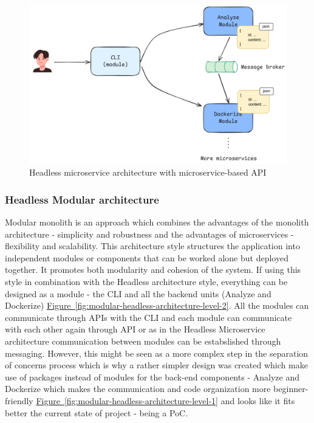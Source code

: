 \documentclass{article}
\newcommand{\FigRef}[1]{\hyperref[#1]{Figure~\ref{#1}}}
\begin{document}
\begin{multicols}{2}
\begin{figure}[H]
    \centering
    \includegraphics[width=\linewidth]{images/headless-microservice-architecture.png}
    \caption{Headless microservice architecture with microservice-based API}
    \label{fig:headless-microservice-architecture}
\end{figure}

\subsubsection{Headless Modular architecture}
Modular monolith is an approach which combines the advantages of the monolith architecture - simplicity and robustness and the advantages of microservices - flexibility and scalability. This architecture style structures the application into independent modules or components that can be worked alone but deployed together. It promotes both modularity and cohesion of the system. If using this style in combination with the Headless architecture style, everything can be designed as a module - the CLI and all the backend units (Analyze and Dockerize) \FigRef{fig:modular-headless-architecture-level-2}. All the modules can communicate through APIs with the CLI and each module can communicate with each other again through API or as in the Headless Microservice architecture communication between modules can be estabslished through messaging. However, this might be seen as a more complex step in the separation of concerns process which is why a rather simpler design was created which make use of packages instead of modules for the back-end components - Analyze and Dockerize which makes the communication and code organization more beginner-friendly \FigRef{fig:modular-headless-architecture-level-1} and looks like it fits better the current state of project - being a PoC.


\end{multicols}
\end{document}
